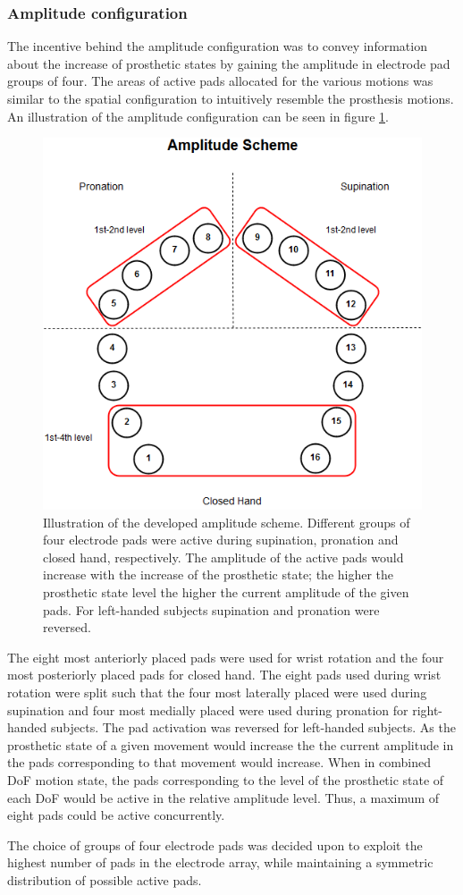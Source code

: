 \subsubsection{Amplitude configuration}
The incentive behind the amplitude configuration was to convey information about the increase of prosthetic states by gaining the amplitude in electrode pad groups of four. The areas of active pads allocated for the various motions was similar to the spatial configuration to intuitively resemble the prosthesis motions. An illustration of the amplitude configuration can be seen in figure \ref{fig:pa:amplitude}. 


\begin{figure}[h]                 
	\includegraphics[width=.8\textwidth]{figures/El_array_amplitude}  
	\caption{Illustration of the developed amplitude scheme. Different groups of four electrode pads were active during supination, pronation and closed hand, respectively. The amplitude of the active pads would increase with the increase of the prosthetic state; the higher the prosthetic state level the higher the current amplitude of the given pads. For left-handed subjects supination and pronation were reversed.}
	\label{fig:pa:amplitude} 
\end{figure}

The eight most anteriorly placed pads were used for wrist rotation and the four most posteriorly placed pads for closed hand. The eight pads used during wrist rotation were split such that the four most laterally placed were used during supination and four most medially placed were used during pronation for right-handed subjects. The pad activation was reversed for left-handed subjects. As the prosthetic state of a given movement would increase the the current amplitude in the pads corresponding to that movement would increase. When in combined DoF motion state, the pads corresponding to the level of the prosthetic state of each DoF would be active in the relative amplitude level. Thus, a maximum of eight pads could be active concurrently. 

The choice of groups of four electrode pads was decided upon to exploit the highest number of pads in the electrode array, while maintaining a symmetric distribution of possible active pads.



